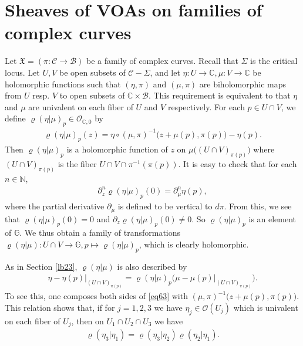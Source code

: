 \documentclass[12pt,b5paper,notitlepage]{report}
\theoremstyle{definition}
\theoremstyle{plain}
\newcommand{\fk}{\mathfrak}
\newcommand{\mc}{\mathcal}
\newcommand{\scr}{\mathscr}
\newcommand{\Gbb}{\mathbb G}
\newcommand{\Cbb}{\mathbb C}
\newcommand{\Nbb}{\mathbb N}
\numberwithin{equation}{section}
\begin{document}
\section{Sheaves of VOAs on families of complex curves}

Let $\fk X=(\pi:\mc C\rightarrow\mc B)$ be a family of complex curves. Recall that $\Sigma$ is the critical locus. Let $U,V$ be open subsets of $\mc C-\Sigma$, and let $\eta:U\rightarrow\Cbb,\mu:V\rightarrow\Cbb$ be holomorphic functions such that $(\eta,\pi)$ and $(\mu,\pi)$ are biholomorphic maps from $U$ resp. $V$ to open subsets of $\Cbb\times\mc B$. This requirement is equivalent to that $\eta$ and $\mu$ are univalent on each fiber of $U$ and $V$ respectively.  For each $p\in U\cap V$, we define $\varrho(\eta|\mu)_p\in\scr O_{\Cbb,0}$ by
\begin{align}
\varrho(\eta|\mu)_p(z)=\eta\circ(\mu,\pi)^{-1}\big(z+\mu(p),\pi(p)\big)-\eta(p).\label{eq62}
\end{align}
Then $\varrho(\eta|\mu)_p$ is a holomorphic function of $z$ on  $\mu\big((U\cap V)_{\pi(p)}\big)$ where $(U\cap V)_{\pi(p)}$ is the fiber $U\cap V\cap \pi^{-1}(\pi(p))$. It is easy to check that for each $n\in\Nbb$,
\begin{align}
\partial_z^n\varrho(\eta|\mu)_p(0)=\partial_\mu^n \eta(p)\label{eq226},
\end{align}
where the partial derivative $\partial_\mu$ is defined to be vertical to $d\pi$. From this, we see that $\varrho(\eta|\mu)_p(0)=0$ and  $\partial_z\varrho(\eta|\mu)_p(0)\neq0$. So $\varrho(\eta|\mu)_p$ is an element of $\Gbb$. We thus obtain a family of transformations $\varrho(\eta|\mu):U\cap V\rightarrow\Gbb,p\mapsto \varrho(\eta|\mu)_p$, which  is clearly holomorphic.

As in Section \ref{lb23}, $\varrho(\eta|\mu)$ is also described by
\begin{align}
\eta-\eta(p)\big|_{(U\cap V)_{\pi(p)}}=\varrho(\eta|\mu)_p\big(\mu-\mu(p)\big|_{(U\cap V)_{\pi(p)}}\big).\label{eq63}
\end{align}
To see this, one composes both sides of \eqref{eq63} with $(\mu,\pi)^{-1}\big(z+\mu(p),\pi(p)\big)$. This relation shows that,   if for $j=1,2,3$ we have $\eta_j\in\scr O(U_j)$ which is univalent on each fiber of $U_j$, then  on $U_1\cap U_2\cap U_3$ we have
\begin{align}
\varrho(\eta_3|\eta_1)=\varrho(\eta_3|\eta_2)\varrho(\eta_2|\eta_1).
\end{align}
\end{document}
